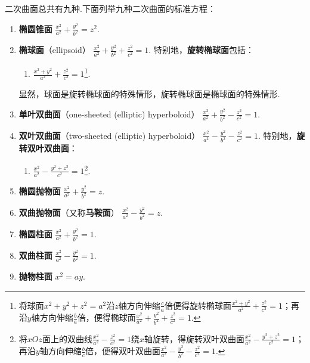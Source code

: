 二次曲面总共有九种.下面列举九种二次曲面的标准方程：
\begin{enumerate}
\item \textbf{椭圆锥面} \(\frac{x^2}{a^2}+\frac{y^2}{b^2}=z^2\).
\item \textbf{椭球面}（ellipsoid） \(\frac{x^2}{a^2}+\frac{y^2}{b^2}+\frac{z^2}{c^2}=1\).
	特别地，\textbf{旋转椭球面}包括：\begin{enumerate}
	\item \(\frac{x^2+y^2}{a^2}+\frac{z^2}{c^2}=1\)\footnote{%
	将球面\(x^2+y^2+z^2=a^2\)沿\(z\)轴方向伸缩\(\frac{c}{a}\)倍便得旋转椭球面\(\frac{x^2+y^2}{a^2}+\frac{z^2}{c^2}=1\)；再沿\(y\)轴方向伸缩\(\frac{b}{a}\)倍，便得椭球面\(\frac{x^2}{a^2}+\frac{y^2}{b^2}+\frac{z^2}{c^2}=1\).%
	}.
	\end{enumerate}
	显然，球面是旋转椭球面的特殊情形，旋转椭球面是椭球面的特殊情形.
\item \textbf{单叶双曲面}（one-sheeted (elliptic) hyperboloid） \(\frac{x^2}{a^2}+\frac{y^2}{b^2}-\frac{z^2}{c^2}=1\).
\item \textbf{双叶双曲面}（two-sheeted (elliptic) hyperboloid） \(\frac{x^2}{a^2}-\frac{y^2}{b^2}-\frac{z^2}{c^2}=1\).
	特别地，\textbf{旋转双叶双曲面}：\begin{enumerate}
	\item \(\frac{x^2}{a^2}-\frac{y^2+z^2}{c^2}=1\)\footnote{%
	将\(xOz\)面上的双曲线\(\frac{x^2}{a^2}-\frac{z^2}{c^2}=1\)绕\(x\)轴旋转，得旋转双叶双曲面\(\frac{x^2}{a^2}-\frac{y^2+z^2}{c^2}=1\)；再沿\(y\)轴方向伸缩\(\frac{b}{c}\)倍，便得双叶双曲面\(\frac{x^2}{a^2}-\frac{y^2}{b^2}-\frac{z^2}{c^2}=1\).%
	}.
	\end{enumerate}
\item \textbf{椭圆抛物面} \(\frac{x^2}{a^2}+\frac{y^2}{b^2}=z\).
\item \textbf{双曲抛物面}（又称\textbf{马鞍面}） \(\frac{x^2}{a^2}-\frac{y^2}{b^2}=z\).
\item \textbf{椭圆柱面} \(\frac{x^2}{a^2}+\frac{y^2}{b^2}=1\).
\item \textbf{双曲柱面} \(\frac{x^2}{a^2}-\frac{y^2}{b^2}=1\).
\item \textbf{抛物柱面} \(x^2=ay\).
\end{enumerate}

